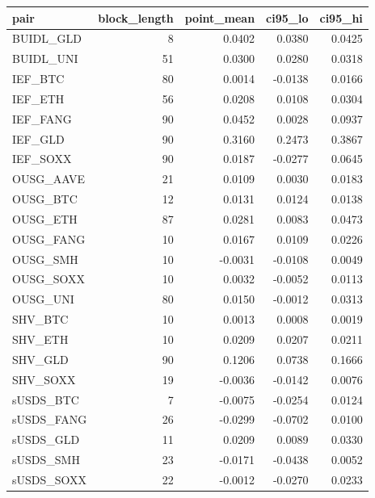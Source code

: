 \begin{tabular}{lrrrr}
\toprule
pair & block\_length & point\_mean & ci95\_lo & ci95\_hi \\
\midrule
BUIDL\_GLD & 8 & 0.0402 & 0.0380 & 0.0425 \\
BUIDL\_UNI & 51 & 0.0300 & 0.0280 & 0.0318 \\
IEF\_BTC & 80 & 0.0014 & -0.0138 & 0.0166 \\
IEF\_ETH & 56 & 0.0208 & 0.0108 & 0.0304 \\
IEF\_FANG & 90 & 0.0452 & 0.0028 & 0.0937 \\
IEF\_GLD & 90 & 0.3160 & 0.2473 & 0.3867 \\
IEF\_SOXX & 90 & 0.0187 & -0.0277 & 0.0645 \\
OUSG\_AAVE & 21 & 0.0109 & 0.0030 & 0.0183 \\
OUSG\_BTC & 12 & 0.0131 & 0.0124 & 0.0138 \\
OUSG\_ETH & 87 & 0.0281 & 0.0083 & 0.0473 \\
OUSG\_FANG & 10 & 0.0167 & 0.0109 & 0.0226 \\
OUSG\_SMH & 10 & -0.0031 & -0.0108 & 0.0049 \\
OUSG\_SOXX & 10 & 0.0032 & -0.0052 & 0.0113 \\
OUSG\_UNI & 80 & 0.0150 & -0.0012 & 0.0313 \\
SHV\_BTC & 10 & 0.0013 & 0.0008 & 0.0019 \\
SHV\_ETH & 10 & 0.0209 & 0.0207 & 0.0211 \\
SHV\_GLD & 90 & 0.1206 & 0.0738 & 0.1666 \\
SHV\_SOXX & 19 & -0.0036 & -0.0142 & 0.0076 \\
sUSDS\_BTC & 7 & -0.0075 & -0.0254 & 0.0124 \\
sUSDS\_FANG & 26 & -0.0299 & -0.0702 & 0.0100 \\
sUSDS\_GLD & 11 & 0.0209 & 0.0089 & 0.0330 \\
sUSDS\_SMH & 23 & -0.0171 & -0.0438 & 0.0052 \\
sUSDS\_SOXX & 22 & -0.0012 & -0.0270 & 0.0233 \\
\bottomrule
\end{tabular}
